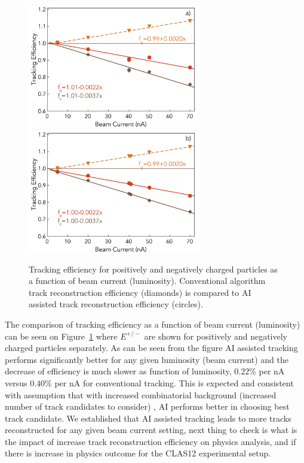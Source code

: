  \begin{figure}[!ht]
\begin{center}
 \includegraphics[width=3.0in]{images/figure_lscan_pos.pdf}
 \includegraphics[width=3.0in]{images/figure_lscan_neg.pdf}
\caption {Tracking efficiency for positively and negatively charged particles as a function of beam current (luminosity).  Conventional algorithm 
track reconstruction efficiency (diamonds) is compared to AI assisted track reconstruction efficiency (circles). }
 \label{lumi:scan}
 \end{center}
\end{figure}

The comparison of tracking efficiency as a function of beam current (luminosity) can be seen on Figure~\ref{lumi:scan} where $E^{+/-}$ are shown for positively and negatively charged particles separately. As can be seen from the figure AI assisted tracking performs significantly better for any given luminosity (beam current) and the decrease of efficiency is much slower as function of luminosity, $0.22\%$ per nA versus $0.40\%$ per nA for conventional tracking. This is expected and consistent with assumption that with increased combinatorial background (increased number of track candidates to consider) , AI performs better in choosing best track candidate. We established that AI assisted
tracking leads to more tracks reconstructed for any given beam current setting, next thing to check is what is the impact of increase track reconstruction
efficiency on physics analysis, and if there is increase in physics outcome for the CLAS12 experimental setup.

